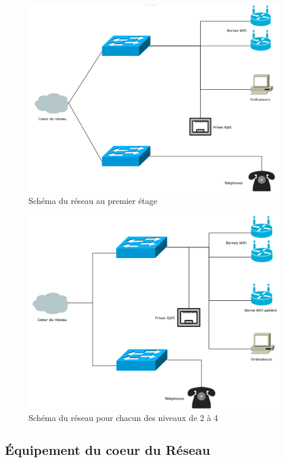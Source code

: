 \begin{figure}[!ht]
    \center
    \includegraphics[width=1\textwidth]{./images/etage_n1.png}
    \caption{Schéma du réseau au premier étage}
\end{figure}

\begin{figure}[!ht]
    \center
    \includegraphics[width=1\textwidth]{./images/etage_n2-4.png}
    \caption{Schéma du réseau pour chacun des niveaux de 2 à 4}
\end{figure}

%
%

    \cleardoublepage

%
%
\subsection{Équipement du coeur du Réseau}

